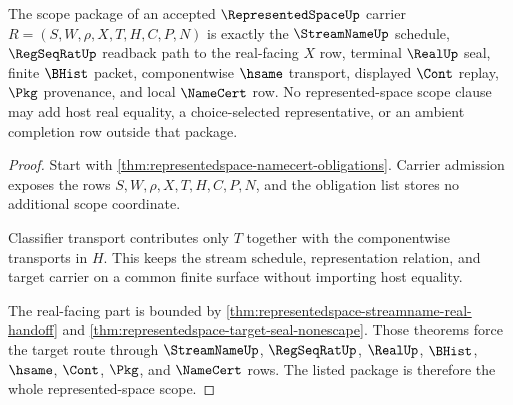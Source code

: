 \begin{theorem}
\label{thm:representedspace-namecert-scope-package}
The scope package of an accepted $\RepresentedSpaceUp$ carrier $R=(S,W,\rho,X,T,H,C,P,N)$ is exactly the $\StreamNameUp$ schedule, $\RegSeqRatUp$ readback path to the real-facing $X$ row, terminal $\RealUp$ seal, finite $\BHist$ packet, componentwise $\hsame$ transport, displayed $\Cont$ replay, $\Pkg$ provenance, and local $\NameCert$ row. No represented-space scope clause may add host real equality, a choice-selected representative, or an ambient completion row outside that package.
\end{theorem}
\begin{proof}
Start with \autoref{thm:representedspace-namecert-obligations}. Carrier admission exposes the rows $S,W,\rho,X,T,H,C,P,N$, and the obligation list stores no additional scope coordinate.

Classifier transport contributes only $T$ together with the componentwise transports in $H$. This keeps the stream schedule, representation relation, and target carrier on a common finite surface without importing host equality.

The real-facing part is bounded by \autoref{thm:representedspace-streamname-real-handoff} and \autoref{thm:representedspace-target-seal-nonescape}. Those theorems force the target route through $\StreamNameUp$, $\RegSeqRatUp$, $\RealUp$, $\BHist$, $\hsame$, $\Cont$, $\Pkg$, and $\NameCert$ rows. The listed package is therefore the whole represented-space scope.
\end{proof}

